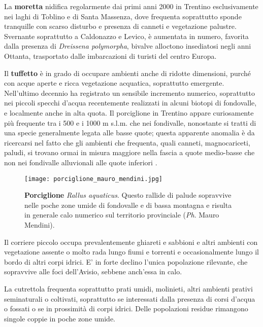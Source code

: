 \documentclass[10pt,twoside,openany,x11names,svgnames,italian,a5paper,dvipsnames,table]{memoir}
\newcommand{\ph}{\emph{Ph}. }
\begin{document}
La \textbf{moretta} nidifica regolarmente dai primi anni 2000 in Trentino esclusivamente nei laghi di Toblino e di Santa Massenza, dove frequenta soprattutto sponde tranquille con scarso disturbo e presenza di canneti e vegetazione palustre. Svernante soprattutto a Caldonazzo e Levico, è aumentata in numero, favorita dalla presenza di \emph{Dreissena polymorpha}, bivalve alloctono insediatosi negli anni Ottanta, trasportato dalle imbarcazioni di turisti del centro Europa.

Il \textbf{tuffetto} è in grado di occupare ambienti anche di ridotte dimensioni, purché con acque aperte e ricca vegetazione acquatica, soprattutto emergente. Nell’ultimo decennio ha registrato un sensibile incremento numerico, soprattutto nei piccoli specchi d’acqua recentemente realizzati in alcuni biotopi di fondovalle, e localmente anche in alta quota. 
Il porciglione in Trentino appare curiosamente più frequente tra i 500 e i 1000 m s.l.m. che nei fondivalle, nonostante si tratti di una specie generalmente legata alle basse quote; questa apparente anomalia è da ricercarsi nel fatto che gli ambienti che frequenta, quali canneti, magnocariceti, paludi, si trovano ormai  in misura maggiore nella fascia a quote medio-basse che non nei fondivalle alluvionali alle quote inferiori \cite{Brambilla12}.

\begin{wrapfigure}[16]{r}{.6\textwidth}
\begin{center}
\vspace{-.7cm}
\texttt{[image: porciglione\_mauro\_mendini.jpg]}
\caption*{\textbf{Porciglione} \emph{Rallus aquaticus}. Questo rallide di palude sopravvive nelle poche zone umide di fondovalle e di bassa montagna e risulta in generale calo numerico sul territorio provinciale (\ph Mauro Mendini).}
\end{center}
\end{wrapfigure}

Il corriere piccolo occupa prevalentemente ghiareti e sabbioni e altri ambienti con vegetazione assente o molto rada lungo fiumi e torrenti e occasionalmente lungo il bordo di altri corpi idrici. E' in forte declino l'unica popolazione rilevante, che sopravvive alle foci dell'Avisio, sebbene anch'essa in calo.

La cutrettola frequenta soprattutto prati umidi, molinieti, altri ambienti prativi seminaturali o coltivati, soprattutto se interessati dalla presenza di corsi d'acqua o fossati o se in prossimità di corpi idrici. Delle popolazioni residue rimangono singole coppie in poche zone umide.
\end{document}

